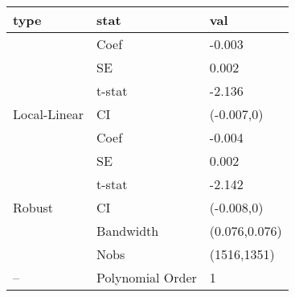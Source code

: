
\begin{tabular}{lll}
\toprule
type & stat & val\\
\midrule
 & Coef & -0.003\\

 & SE & 0.002\\

 & t-stat & -2.136\\

\multirow{-4}{*}{\raggedright\arraybackslash Local-Linear} & CI & (-0.007,0)\\
\cmidrule{1-3}
 & Coef & -0.004\\

 & SE & 0.002\\

 & t-stat & -2.142\\

\multirow{-4}{*}{\raggedright\arraybackslash Robust} & CI & (-0.008,0)\\
\cmidrule{1-3}
 & Bandwidth & (0.076,0.076)\\

 & Nobs & (1516,1351)\\

\multirow{-3}{*}{\raggedright\arraybackslash --} & Polynomial Order & 1\\
\bottomrule
\end{tabular}